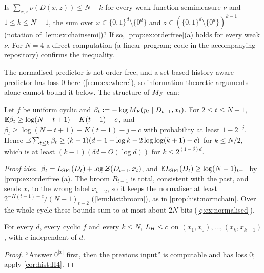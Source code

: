 \begin{question}\label{q:ex:depthweak}
Is $\sum_{x,z}\nu(D(x,z))\le N-k$ for every weak function semimeasure $\nu$ and $1\le k\le N-1$, the sum over $x\in\{0,1\}^d\setminus\{0^d\}$ and $z\in(\{0,1\}^d\setminus\{0^d\})^{k-1}$ (notation of \cref{lem:ex:chainsemi})? If so, \cref{prop:ex:orderfree}(a) holds for every weak $\nu$. For $N=4$ a direct computation (a linear program; code in the accompanying repository) confirms the inequality.
\end{question}

The normalised predictor is not order-free, and a set-based history-aware predictor has loss $0$ here (\cref{rem:ex:where}), so information-theoretic arguments alone cannot bound it below. The structure of $M_{F}$ can:

\begin{proposition}\label{prop:ex:normalised}
Let $f$ be uniform cyclic and $\beta_t:=-\log\bar{M}_{F}(y_t\mid D_{t-1},x_t)$. For $2\le t\le N-1$, $\mathbb{E}\beta_t\ge\log(N-t+1)-K(t-1)-c$, and $\beta_t\ge\log(N-t+1)-K(t-1)-j-c$ with probability at least $1-2^{-j}$. Hence $\mathbb{E}\sum_{t\le k}\beta_t\ge(k-1)(d-1-\log k-2\log\log(k+1)-c)$ for $k\le N/2$, which is at least $(k-1)(\delta d-O(\log d))$ for $k\le2^{(1-\delta)d}$.
\end{proposition}

\emph{Proof idea.} $\beta_t=L_{\mathrm{SFI}}(D_t)+\log\mathcal{Z}(D_{t-1},x_t)$, and $\mathbb{E}L_{\mathrm{SFI}}(D_t)\ge\log(N-1)_{t-1}$ by \cref{prop:ex:orderfree}(a). The broom $B_{t-1}$ is total, consistent with the past, and sends $x_t$ to the wrong label $x_{t-2}$, so it keeps the normaliser at least $2^{-K(t-1)-c}/(N-1)_{t-2}$ (\cref{lem:hist:broom}), as in \cref{prop:hist:normchain}. Over the whole cycle these bounds sum to at most about $2N$ bits (\cref{q:ex:normalised}).

\begin{proposition}[\SFIhist]\label{prop:ex:cychist}
For every $d$, every cyclic $f$ and every $k\le N$, $L_{H}\le c$ on $(x_1,x_0),\dots,(x_k,x_{k-1})$, with $c$ independent of $d$.
\end{proposition}

\begin{proof}
``Answer $0^{|x|}$ first, then the previous input'' is computable and has loss $0$; apply \cref{cor:hist:H4}.
\end{proof}

